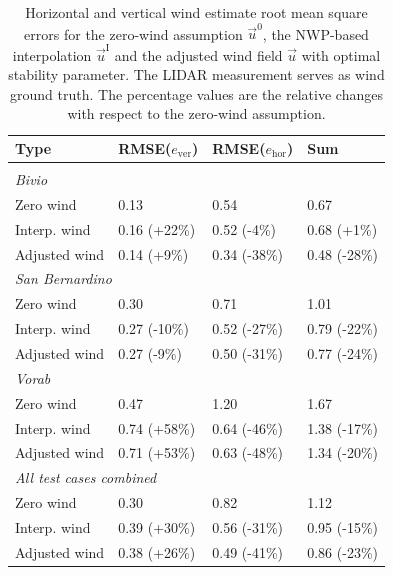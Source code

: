 \documentclass[twocolumn,letterpaper]{IEEEAerospaceCLS}
\begin{document}
\begin{table}[htb]
\centering
\caption[Root mean square errors]{Horizontal and vertical wind estimate root mean square errors for the zero-wind assumption $\vec{u}^0$, the \ac{NWP}-based interpolation $\vec{u}^\text{I}$ and the adjusted wind field $\vec{u}$ with optimal stability parameter. The LIDAR measurement serves as wind ground truth. The percentage values are the relative changes with respect to the zero-wind assumption.}
\begin{tabular}{l l l l}
\toprule
Type & RMSE($e_\text{ver}$) & RMSE($e_\text{hor}$) & Sum \\
\midrule \\[-1.8ex]
\emph{Bivio} &&&\\\addlinespace[-0.1ex]\cmidrule(l{6pt}){1-1}
Zero wind & 0.13 & 0.54 & 0.67 \\
Interp. wind & 0.16 (+22\%) & 0.52 (-4\%)& 0.68 (+1\%)\\ 
Adjusted wind & 0.14 (+9\%)& 0.34 (-38\%)& 0.48 (-28\%)\\[1.2ex]%
\multicolumn{4}{l}{\emph{San Bernardino}}\\\addlinespace[-0.1ex]\cmidrule(l{6pt}){1-1}
Zero wind & 0.30 & 0.71 & 1.01 \\
Interp. wind & 0.27 (-10\%)& 0.52 (-27\%)& 0.79 (-22\%)\\ 
Adjusted wind & 0.27 (-9\%)& 0.50 (-31\%)& 0.77 (-24\%)\\[1.2ex]
\emph{Vorab} &&&\\\addlinespace[-0.1ex]\cmidrule(l{6pt}){1-1}
Zero wind & 0.47 & 1.20 & 1.67 \\
Interp. wind & 0.74 (+58\%)& 0.64 (-46\%)& 1.38 (-17\%)\\ 
Adjusted wind & 0.71 (+53\%)& 0.63 (-48\%)& 1.34 (-20\%)\\[1.2ex] 
\multicolumn{4}{l}{\emph{All test cases combined}}\\\addlinespace[-0.1ex]\cmidrule(l{6pt}){1-1}
Zero wind & 0.30 & 0.82 & 1.12 \\
Interp. wind & 0.39 (+30\%)& 0.56 (-31\%)& 0.95 (-15\%)\\ 
Adjusted wind & 0.38 (+26\%)& 0.49 (-41\%)& 0.86 (-23\%)\\ 
\bottomrule
\end{tabular}
\label{tab:PL_WindPred_rmse}
\end{table}
\end{document}
